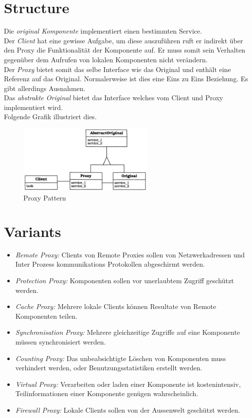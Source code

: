 \section{Structure}
Die \textit{original Komponente} implementiert einen bestimmten Service. \\
Der \textit{Client} hat eine gewisse Aufgabe, um diese auszuführen ruft er indirekt über den Proxy die Funktionalität der Komponente auf. Er muss somit sein Verhalten gegenüber dem Aufrufen von lokalen Komponenten nicht verändern.\\
Der \textit{Proxy} bietet somit das selbe Interface wie das Original und enthält eine Referenz auf das Original. Normalerweise ist dies eine Eins zu Eins Beziehung. Es gibt allerdings Ausnahmen. \\
Das \textit{abstrakte Original} bietet das Interface welches vom Client und Proxy implementiert wird.\\
Folgende Grafik illustriert dies.
\begin{figure}[H]
	\centering
	\includegraphics[width=0.6\textwidth]{figures/09-proxy-1.png}
	\caption{Proxy Pattern}
\end{figure}

\section{Variants}
\begin{itemize}
	\item \textit{Remote Proxy:} Clients von Remote Proxies sollen von Netzwerkadressen und Inter Prozess kommunikations Protokollen abgeschirmt werden.
	\item \textit{Protection Proxy:} Komponenten sollen vor unerlaubtem Zugriff geschützt werden.
	\item \textit{Cache Proxy:} Mehrere lokale Clients können Resultate von Remote Komponenten teilen.
	\item \textit{Synchronisation Proxy:} Mehrere gleichzeitige Zugriffe auf eine Komponente müssen synchronisiert werden.
	\item \textit{Counting Proxy:} Das unbeabsichtigte Löschen von Komponenten muss verhindert werden, oder Benutzungsstatistiken erstellt werden.
	\item \textit{Virtual Proxy:} Verarbeiten oder laden einer Komponente ist kostenintensiv, Teilinformationen einer Komponente genügen wahrscheinlich.
	\item \textit{Firewall Proxy:} Lokale Clients sollen von der Aussenwelt geschützt werden.
\end{itemize}

